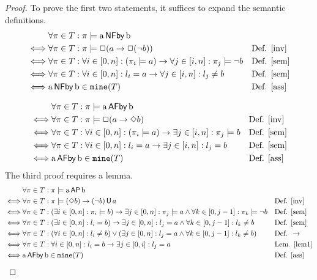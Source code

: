 \documentclass[a4paper,10pt]{scrartcl}
\newcommand{\NFBy}[2]{\ensuremath{\textup{{#1}\,\textsf{NFby}\,{#2}}}}
\newcommand{\AFBy}[2]{\ensuremath{\textup{{#1}\,\textsf{AFby}\,{#2}}}}
\newcommand{\AP}[2]{\ensuremath{\textup{{#1}\,\textsf{AP}\,{#2}}}}
\newcommand{\mine}{\ensuremath{\textup{\texttt{mine}}}}
\newcommand{\impl}{\ensuremath{\rightarrow}}
\newcommand{\Def}{\ensuremath{\textup{Def. }}}
\newcommand{\Lem}{\ensuremath{\textup{Lem. }}}
\newcommand{\until}{\ensuremath{\textup{\,\textsf{U}\,}}}
\begin{document}
\begin{proof}
To prove the first two statements, it suffices to expand the semantic definitions.
 \begin{align*}
     &\forall \pi\in{T}: \pi\models\NFBy{a}{b}&&\\
 \iff&\forall \pi\in{T}: \pi\models\Box(a\rightarrow\Box(\neg{b}))&&\Def\ref{inv}\\
 \iff&\forall \pi\in{T}: \forall{i\in[0,n]}:(\pi_i\models a)\rightarrow\forall{j\in[i,n]}:\pi_j\models\neg{b}&&\Def\ref{sem}\\
 \iff&\forall \pi\in{T}: \forall{i\in[0,n]}:l_i=a\rightarrow\forall{j\in[i,n]}:l_j\not={b}&&\Def\ref{sem}\\
 \iff&\NFBy{a}{b}\in\mine(T)&&\Def\ref{ass}
 \end{align*}

 \begin{align*}
     &\forall \pi\in{T}: \pi\models\AFBy{a}{b}&&\\
 \iff&\forall \pi\in{T}: \pi\models\Box(a\rightarrow\Diamond{b})&&\Def\ref{inv}\\
 \iff&\forall \pi\in{T}: \forall{i\in[0,n]}:(\pi_i\models a)\rightarrow\exists{j\in[i,n]}:\pi_j\models{b}&&\Def\ref{sem}\\
 \iff&\forall \pi\in{T}: \forall{i\in[0,n]}:l_i=a\rightarrow\exists{j\in[i,n]}:l_j={b}&&\Def\ref{sem}\\
 \iff&\AFBy{a}{b} \in\mine(T)&&\Def\ref{ass}
 \end{align*}
The third proof requires a lemma.
 \begin{align*}
     &\forall \pi\in{T}: \pi\models\AP{a}{b}&&\\
 \iff&\forall \pi\in{T}: \pi\models(\Diamond{b})\rightarrow(\neg{b})\until{a}&&\Def\ref{inv}\\
 \iff&\forall \pi\in{T}: (\exists{i\in[0,n]}:\pi_i\models b)\impl\exists{j\in[0,n]}:\pi_j\models{a}\land\forall{k\in[0,j-1]:\pi_k\models\neg{b}}&&\Def\ref{sem}\\
 \iff&\forall \pi\in{T}: (\exists{i\in[0,n]}:l_i=b)\impl\exists{j\in[0,n]}:l_j={a}\land\forall{k\in[0,j-1]:l_k\not={b}}&&\Def\ref{sem}\\
 \iff&\forall \pi\in{T}: (\forall{i\in[0,n]}:l_i\not=b)\lor(\exists{j\in[0,n]}:l_j={a}\land\forall{k\in[0,j-1]:l_k\not={b}})&&\Def\impl\\
 \iff&\forall \pi\in{T}: \forall{i\in[0,n]}:l_i=b\impl\exists{j\in[0,i]}:l_j={a}&&\Lem\ref{lem1}\\
 \iff&\AFBy{a}{b} \in\mine(T)&&\Def\ref{ass}
 \end{align*}

\end{proof}
\end{document}
